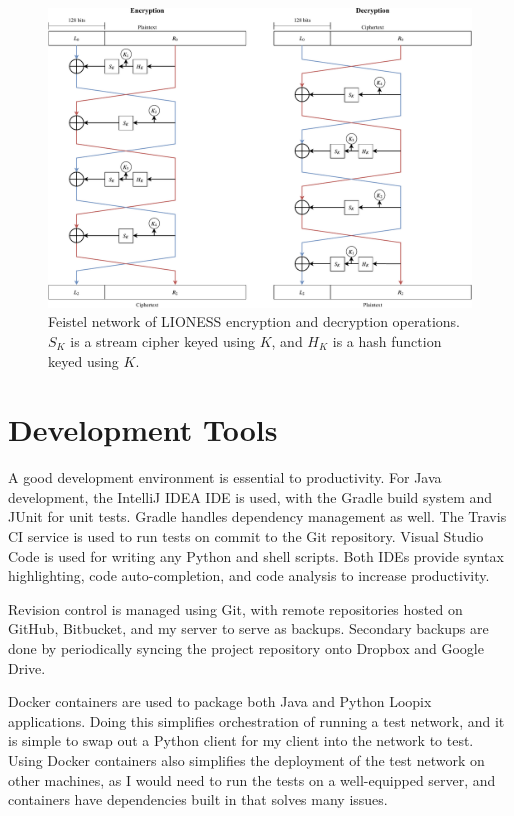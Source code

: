 \documentclass[final,dissertation.tex]{subfiles}
\begin{document}
\begin{figure}[h]
	\includegraphics[width=\linewidth]{../figs/lioness_feistel}
	\caption{Feistel network of LIONESS encryption and decryption operations. $S_K$ is a stream cipher keyed using $K$, and $H_K$ is a hash function keyed using $K$.}
	\label{fig:lioness_feistel}
\end{figure}

\section{Development Tools}

A good development environment is essential to productivity. For Java development, the IntelliJ IDEA IDE is used,  with the Gradle build system and JUnit for unit tests. Gradle handles dependency management as well. The Travis CI service is used to run tests on commit to the Git repository. Visual Studio Code is used for writing any Python and shell scripts. Both IDEs provide syntax highlighting, code auto-completion, and code analysis to increase productivity.

Revision control is managed using Git, with remote repositories hosted on GitHub, Bitbucket, and my server to serve as backups. Secondary backups are done by periodically syncing the project repository onto Dropbox and Google Drive.

Docker containers are used to package both Java and Python Loopix applications. Doing this simplifies orchestration of running a test network, and it is simple to swap out a Python client for my client into the network to test. Using Docker containers also simplifies the deployment of the test network on other machines, as I would need to run the tests on a well-equipped server, and containers have dependencies built in that solves many issues.
\end{document}
